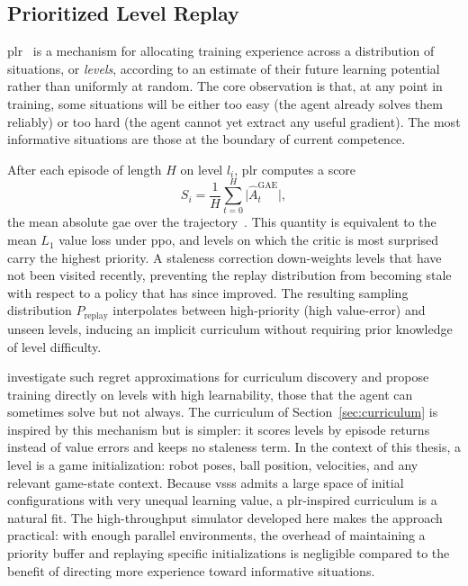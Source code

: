 \subsection{Prioritized Level Replay}

\gls{plr}~\cite{prioritized_level_replay} is a mechanism for allocating training
experience across a distribution of situations, or \emph{levels}, according to
an estimate of their future learning potential rather than uniformly at random.
The core observation is that, at any point in training, some situations will
be either too easy (the agent already solves them reliably) or too hard
(the agent cannot yet extract any useful gradient).  The most informative
situations are those at the boundary of current competence.

After each episode of length $H$ on level $l_i$, \gls{plr} computes a score
%
\begin{equation}
    S_i = \frac{1}{H}\sum_{t=0}^{H}\bigl|\hat{A}_t^{\mathrm{GAE}}\bigr|,
    \label{eq:plr_score}
\end{equation}
%
the mean absolute \gls{gae} over the trajectory~\cite{prioritized_level_replay}.  This
quantity is equivalent to the mean $L_1$ value loss under \gls{ppo}, and
levels on which the critic is most surprised carry the highest priority.  A
staleness correction down-weights levels that have not been visited recently,
preventing the replay distribution from becoming stale with respect to a
policy that has since improved.  The resulting sampling distribution
$P_{\mathrm{replay}}$ interpolates between high-priority (high value-error)
and unseen levels, inducing an implicit curriculum without requiring prior
knowledge of level difficulty.

\textcite{rutherford2024noregrets} investigate such regret approximations for curriculum discovery and propose training directly on levels with high learnability, those that the agent can sometimes solve but not always.  The curriculum of Section~\ref{sec:curriculum} is inspired by this mechanism but is simpler: it scores levels by episode returns instead of value errors and keeps no staleness term.
In the context of this thesis, a level is a game initialization: robot poses,
ball position, velocities, and any relevant game-state context.  Because
\gls{vsss} admits a large space of initial configurations with very unequal
learning value, a \gls{plr}-inspired curriculum is a natural fit.  The high-throughput simulator
developed here makes the approach practical: with enough parallel environments,
the overhead of maintaining a priority buffer and replaying specific
initializations is negligible compared to the benefit of directing more
experience toward informative situations.

